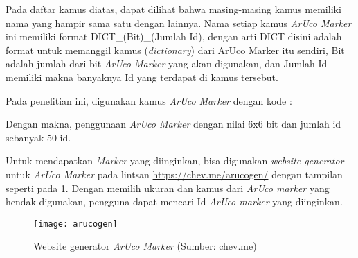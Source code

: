 

Pada daftar kamus diatas, dapat dilihat bahwa masing-masing kamus memiliki nama yang hampir sama satu dengan lainnya. Nama setiap kamus \textit{ArUco Marker} ini memiliki format DICT\_(Bit)\_(Jumlah Id), dengan arti DICT disini adalah format untuk memanggil kamus (\textit{dictionary}) dari ArUco Marker itu sendiri, Bit adalah jumlah dari bit \textit{ArUco Marker} yang akan digunakan, dan Jumlah Id memiliki makna banyaknya Id yang terdapat di kamus tersebut.

Pada penelitian ini, digunakan kamus \textit{ArUco Marker} dengan kode :



Dengan makna, penggunaan \textit{ArUco Marker} dengan nilai 6x6 bit dan jumlah id sebanyak 50 id. 

Untuk mendapatkan \textit{Marker} yang diinginkan, bisa digunakan \textit{website generator} untuk \textit{ArUco Marker} pada lintsan \url{https://chev.me/arucogen/} dengan tampilan seperti pada \cref{fig:arucogen}. Dengan memilih ukuran dan kamus dari \textit{ArUco marker} yang hendak digunakan, pengguna dapat mencari Id \textit{ArUco marker} yang diinginkan.

\begin{figure}[H]
	\centering
	\texttt{[image: arucogen]}
	\caption{Website generator \textit{ArUco Marker} (Sumber: chev.me)}
	\label{fig:arucogen}
\end{figure}

